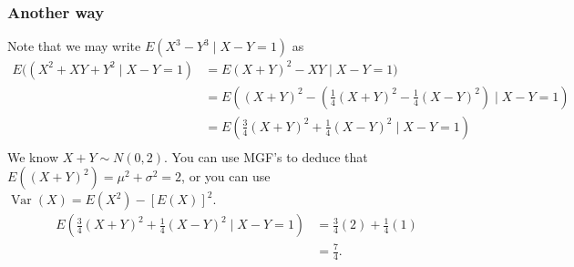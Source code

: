 \documentclass{article}
\DeclareMathOperator{\Var}{Var}
\begin{document}
\subsubsection*{Another way}
Note that we may write $E(X^3 - Y^3 \mid X-Y = 1)$ as \begin{align*}
    E((X^2 + XY + Y^2 \mid X-Y = 1) &= E(X+Y)^2 - XY \mid X-Y = 1) \\
    &= E\left((X+Y)^2 - \left(\frac{1}{4}(X+Y)^2 - \frac{1}{4}(X-Y)^2 \right)\mid X-Y = 1\right) \\
    &= E\left(\frac{3}{4}(X+Y)^2 + \frac{1}{4}(X-Y)^2 \mid X-Y = 1\right) \\
\end{align*}
We know $X+Y \sim N(0,2)$. You can use MGF's to deduce that $E((X+Y)^2) = \mu^2 + \sigma^2 = 2$, or you can use $\Var(X)=E(X^2) - [E(X)]^2$. 
\begin{align*}
    E\left(\frac{3}{4}(X+Y)^2 + \frac{1}{4}(X-Y)^2 \mid X-Y = 1\right) &= \frac{3}{4} (2)  + \frac{1}{4} (1) \\
    &= \frac{7}{4}.
\end{align*}
\end{document}

